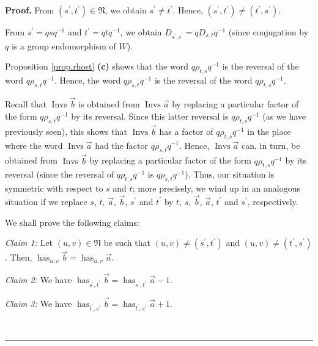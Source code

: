 \documentclass[numbers=enddot,12pt,final,onecolumn,notitlepage,abstracton]{scrartcl}%
\theoremstyle{definition}
\newenvironment{proof}[1][Proof]{\noindent\textbf{#1.} }{\ \rule{0.5em}{0.5em}}
\begin{document}
\begin{proof}
From $\left(  s^{\prime},t^{\prime}\right)  \in\mathfrak{N}$, we obtain
$s^{\prime}\neq t^{\prime}$. Hence, $\left(  s^{\prime},t^{\prime}\right)
\neq\left(  t^{\prime},s^{\prime}\right)  $.

From $s^{\prime}=qsq^{-1}$ and $t^{\prime}=qtq^{-1}$, we obtain $D_{s^{\prime
},t^{\prime}}=qD_{s,t}q^{-1}$ (since conjugation by $q$ is a group
endomorphism of $W$).

Proposition \ref{prop.rhost} \textbf{(c)} shows that the word $q\rho
_{t,s}q^{-1}$ is the reversal of the word $q\rho_{s,t}q^{-1}$. Hence, the word
$q\rho_{s,t}q^{-1}$ is the reversal of the word $q\rho_{t,s}q^{-1}$.

Recall that $\operatorname*{Invs}\overrightarrow{b}$ is obtained from
$\operatorname*{Invs}\overrightarrow{a}$ by replacing a particular factor of
the form $q\rho_{s,t}q^{-1}$ by its reversal. Since this latter reversal is
$q\rho_{t,s}q^{-1}$ (as we have previously seen), this shows that
$\operatorname*{Invs}\overrightarrow{b}$ has a factor of $q\rho_{t,s}q^{-1}$
in the place where the word $\operatorname*{Invs}\overrightarrow{a}$ had the
factor $q\rho_{s,t}q^{-1}$. Hence, $\operatorname*{Invs}\overrightarrow{a}$
can, in turn, be obtained from $\operatorname*{Invs}\overrightarrow{b}$ by
replacing a particular factor of the form $q\rho_{t,s}q^{-1}$ by its reversal
(since the reversal of $q\rho_{t,s}q^{-1}$ is $q\rho_{s,t}q^{-1}$). Thus, our
situation is symmetric with respect to $s$ and $t$; more precisely, we wind up
in an analogous situation if we replace $s$, $t$, $\overrightarrow{a}$,
$\overrightarrow{b}$, $s^{\prime}$ and $t^{\prime}$ by $t$, $s$,
$\overrightarrow{b}$, $\overrightarrow{a}$, $t^{\prime}$ and $s^{\prime}$, respectively.

We shall prove the following claims:

\textit{Claim 1:} Let $\left(  u,v\right)  \in\mathfrak{N}$ be such that
$\left(  u,v\right)  \neq\left(  s^{\prime},t^{\prime}\right)  $ and $\left(
u,v\right)  \neq\left(  t^{\prime},s^{\prime}\right)  $. Then,
$\operatorname*{has}\nolimits_{u,v}\overrightarrow{b}=\operatorname*{has}%
\nolimits_{u,v}\overrightarrow{a}$.

\textit{Claim 2:} We have $\operatorname*{has}\nolimits_{s^{\prime},t^{\prime
}}\overrightarrow{b}=\operatorname*{has}\nolimits_{s^{\prime},t^{\prime}%
}\overrightarrow{a}-1$.

\textit{Claim 3:} We have $\operatorname*{has}\nolimits_{t^{\prime},s^{\prime
}}\overrightarrow{b}=\operatorname*{has}\nolimits_{t^{\prime},s^{\prime}%
}\overrightarrow{a}+1$.


\end{proof}
\end{document}

